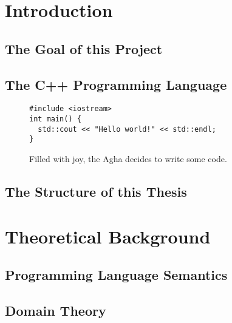 \documentclass[diploma]{softlab-thesis}
\begin{document}
\englishtext

\chapter{Introduction}

\section{The Goal of this Project}

\section{The C++ Programming Language}


\begin{figure}[t]
\setlength\partopsep{-\topsep}%
\begin{verbatim}
#include <iostream>
int main() {
  std::cout << "Hello world!" << std::endl;
}
\end{verbatim}
\caption{Filled with joy, the Agha decides to write some code.%
  \label{fig:hello-english}}
\end{figure}


\section{The Structure of this Thesis}

\chapter{Theoretical Background}

\section{Programming Language Semantics}

\section{Domain Theory}




\nocite{*}



\end{document}

